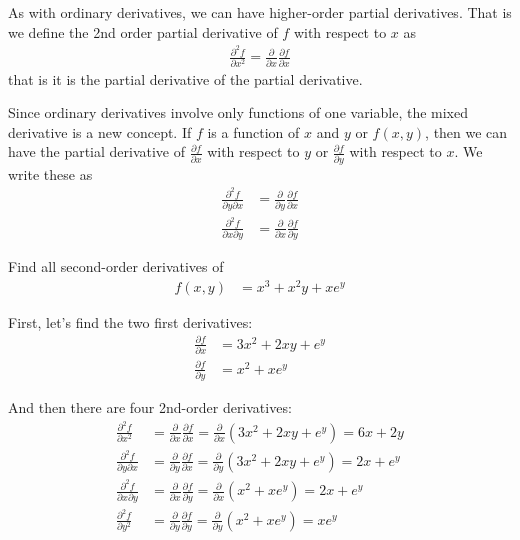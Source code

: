 As with ordinary derivatives, we can have higher-order partial derivatives.  That is we define the 2nd order partial derivative of $f$ with respect to $x$ as
%
\begin{align*}
\frac{\partial^2 f}{\partial x^2} = \frac{\partial}{\partial x} \frac{\partial f}{\partial x}
\end{align*}
that is it is the partial derivative of the partial derivative.

Since ordinary derivatives involve only functions of one variable, the mixed derivative is a new concept.  If $f$ is a function of $x$ and $y$ or $f(x,y)$, then we can have the partial derivative of $\frac{\partial f}{\partial x}$ with respect to $y$ or $\frac{\partial f}{\partial y}$ with respect to $x$.   We write these as
%
\begin{align*}
\frac{\partial^2 f}{\partial y \partial x} & = \frac{\partial}{\partial y} \frac{\partial f}{\partial x} \\
\frac{\partial^2 f}{\partial x \partial y} & = \frac{\partial}{\partial x} \frac{\partial f}{\partial y}
\end{align*}


\begin{example}
Find all second-order derivatives of
%
\begin{align*}
f(x,y) & = x^3 + x^2y + xe^y
\end{align*}

\solution

First, let's find the two first derivatives:
%
\begin{align*}
\frac{\partial f}{\partial x} & = 3x^2 + 2xy + e^y \\
\frac{\partial f}{\partial y} & = x^2 + xe^y
\end{align*}

And then there are four 2nd-order derivatives:
%
\begin{align*}
\frac{\partial^2 f}{\partial x^2} & = \frac{\partial}{\partial x} \frac{\partial f}{\partial x} = \frac{\partial}{\partial x} (3x^2 + 2xy + e^y) = 6x + 2y \\
\frac{\partial^2 f}{\partial y \partial x} & = \frac{\partial}{\partial y} \frac{\partial f}{\partial x} = \frac{\partial}{\partial y} (3x^2+2xy+e^y) = 2x + e^y \\
\frac{\partial^2 f}{\partial x \partial y} & = \frac{\partial}{\partial x} \frac{\partial f}{\partial y} = \frac{\partial}{\partial x} (x^2+xe^y) = 2x + e^y \\
\frac{\partial^2 f}{\partial y^2} & = \frac{\partial}{\partial y} \frac{\partial f}{\partial y} = \frac{\partial}{\partial y} (x^2+xe^y) = xe^y
\end{align*}


\end{example}

